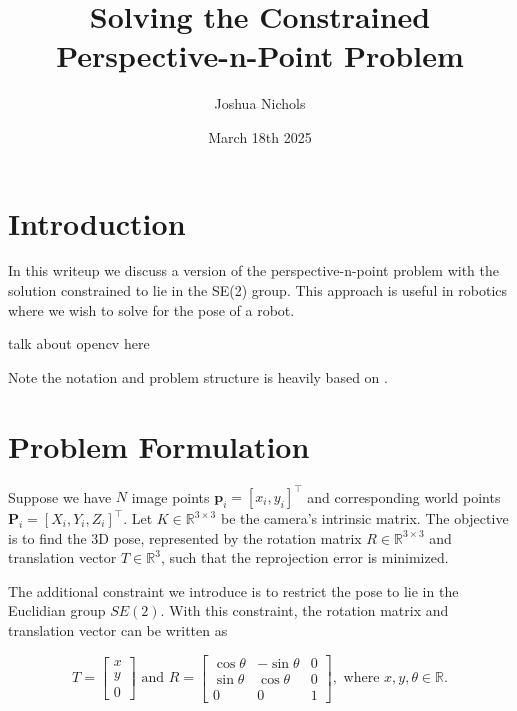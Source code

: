 \documentclass[12pt]{article}
\begin{document}
\title{Solving the Constrained Perspective-n-Point Problem}
\author{Joshua Nichols}
\date{March 18th 2025}
\maketitle

\section{Introduction}

In this writeup we discuss a version of the perspective-n-point problem with the solution constrained to lie in the SE(2) group. This approach is useful in robotics where we wish to solve for the pose of a robot.

talk about opencv here

Note the notation and problem structure is heavily based on \cite{zhou2019iros}.

\newpage

\section{Problem Formulation}

Suppose we have $N$ image points $\mathbf{p}_i=[x_i,y_i]^\intercal$ and corresponding world points $\mathbf{P}_i=[X_i,Y_i,Z_i]^\intercal$. 
Let $K\in \mathbb{R}^{3\times 3}$ be the camera's intrinsic matrix. 
The objective is to find the 3D pose, represented by the rotation matrix $R\in \mathbb{R}^{3\times 3}$ and translation vector $T\in\mathbb{R}^3$, such that the reprojection error is minimized. 

The additional constraint we introduce is to restrict the pose to lie in the Euclidian group $SE(2)$. With this constraint, the rotation matrix and translation vector can be written as

\begin{equation}
  T=\begin{bmatrix}
    x \\ y \\ 0
  \end{bmatrix}\text{ and }R=\begin{bmatrix}
    \cos \theta & -\sin\theta & 0\\
    \sin \theta & \cos \theta & 0\\
    0 & 0 & 1
  \end{bmatrix},\text{ where }x,y,\theta\in\mathbb{R}.
\end{equation}
\end{document}
